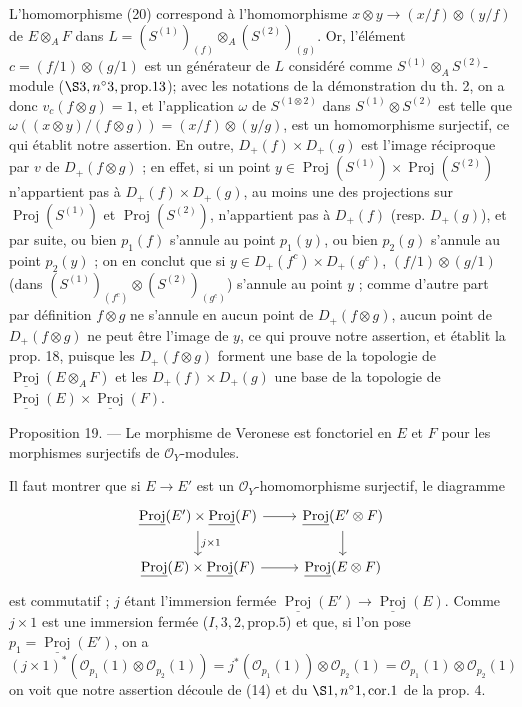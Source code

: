 L'homomorphisme (20) correspond à l'homomorphisme $x \otimes y \to (x/f) \otimes (y/f)$ de $E \otimes_A F$ dans $L = (S^{(1)})_{(f)} \otimes_A (S^{(2)})_{(g)}$. Or, l'élément $c = (f/1) \otimes (g/1)$ est un générateur de $L$ considéré comme $S^{(1)} \otimes_A S^{(2)}$-module ($\S 3, n^\circ 3, \text{prop.} 13$); avec les notations de la démonstration du th. 2, on a donc $v_c(f \otimes g) = 1$, et l'application $\omega$ de $S^{(1 \otimes 2)}$ dans $S^{(1)} \otimes S^{(2)}$ est telle que $\omega((x \otimes y)/(f \otimes g)) = (x/f) \otimes (y/g)$, est un homomorphisme surjectif, ce qui établit notre assertion. En outre, $D_+(f) \times D_+(g)$ est l'image réciproque par $v$ de $D_+(f \otimes g)$ ; en effet, si un point $y \in \operatorname{Proj}(S^{(1)}) \times \operatorname{Proj}(S^{(2)})$ n'appartient pas à $D_+(f) \times D_+(g)$, au moins une des projections sur $\operatorname{Proj}(S^{(1)})$ et $\operatorname{Proj}(S^{(2)})$, n'appartient pas à $D_+(f)$ (resp. $D_+(g)$), et par suite, ou bien $p_1(f)$ s'annule au point $p_1(y)$, ou bien $p_2(g)$ s'annule au point $p_2(y)$ ; on en conclut que si $y \in D_+(f^c) \times D_+(g^c)$, $(f/1) \otimes (g/1)$ (dans $(S^{(1)})_{(f^c)} \otimes (S^{(2)})_{(g^c)}$) s'annule au point $y$ ; comme d'autre part par définition $f \otimes g$ ne s'annule en aucun point de $D_+(f \otimes g)$, aucun point de $D_+(f \otimes g)$ ne peut être l'image de $y$, ce qui prouve notre assertion, et établit la prop. 18, puisque les $D_+(f \otimes g)$ forment une base de la topologie de $\underline{\operatorname{Proj}}(E \otimes_A F)$ et les $D_+(f) \times D_+(g)$ une base de la topologie de $\underline{\operatorname{Proj}}(E) \times \underline{\operatorname{Proj}}(F)$.

Proposition 19. — Le morphisme de Veronese est fonctoriel en $E$ et $F$ pour les morphismes surjectifs de $\mathcal{O}_Y$-modules.

Il faut montrer que si $E \to E'$ est un $\mathcal{O}_Y$-homomorphisme surjectif, le diagramme
$$\begin{tikzcd}
\underline{\operatorname{Proj}}(E') \times \underline{\operatorname{Proj}}(F) \arrow[d, "j \times 1"] \arrow[r] & \underline{\operatorname{Proj}}(E' \otimes F) \arrow[d] \\
\underline{\operatorname{Proj}}(E) \times \underline{\operatorname{Proj}}(F) \arrow[r] & \underline{\operatorname{Proj}}(E \otimes F)
\end{tikzcd}$$
est commutatif ; $j$ étant l'immersion fermée $\underline{\operatorname{Proj}}(E') \to \underline{\operatorname{Proj}}(E)$. Comme $j \times 1$ est une immersion fermée ($I, 3, 2, \text{prop.} 5$) et que, si l'on pose $p_1 = \underline{\operatorname{Proj}}(E')$, on a $(j \times 1)^* (\mathcal{O}_{p_1}(1) \otimes \mathcal{O}_{p_2}(1)) = j^*(\mathcal{O}_{p_1}(1)) \otimes \mathcal{O}_{p_2}(1) = \mathcal{O}_{p_1}(1) \otimes \mathcal{O}_{p_2}(1)$ on voit que notre assertion découle de (14) et du $\S 1, n^\circ 1, \text{cor.} 1$ de la prop. 4.

